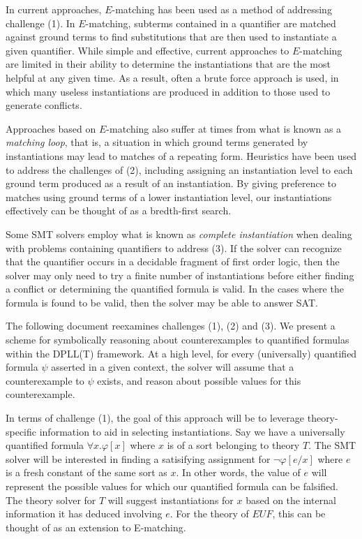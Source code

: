 \documentclass{llncs}
\begin{document}
In current approaches, $E$-matching has been used as a method of addressing challenge (1).
In $E$-matching, subterms contained in a quantifier are matched against ground terms to find substitutions that are then used to instantiate a given quantifier.
While simple and effective, current approaches to $E$-matching are limited in their ability to determine the instantiations that are the most helpful at any given time.
As a result, often a brute force approach is used, in which many useless instantiations are produced in addition to those used to generate conflicts.

Approaches based on $E$-matching also suffer at times from what is known as a \emph{matching loop}, that is, a situation in which ground terms generated by instantiations may lead to matches of a repeating form.
Heuristics have been used to address the challenges of (2), including assigning an instantiation level to each ground term produced as a result of an instantiation.
By giving preference to matches using ground terms of a lower instantiation level, our instantiations effectively can be thought of as a bredth-first search.

Some SMT solvers employ what is known as \emph{complete instantiation} when dealing with problems containing quantifiers to address (3).
If the solver can recognize that the quantifier occurs in a decidable fragment of first order logic, then the solver may only need to try a finite number of instantiations before either finding a conflict or determining the quantified formula is valid.
In the cases where the formula is found to be valid, then the solver may be able to answer SAT.

The following document reexamines challenges (1), (2) and (3).
We present a scheme for symbolically reasoning about counterexamples to quantified formulas within the DPLL(T) framework.
At a high level, for every (universally) quantified formula $\psi$ asserted in a given context, the solver will assume that a counterexample to $\psi$ exists, and reason about possible values for this counterexample.

In terms of challenge (1), the goal of this approach will be to leverage theory-specific information to aid in selecting instantiations.
Say we have a universally quantified formula $\forall x. \varphi[x]$ where $x$ is of a sort belonging to theory $T$.
The SMT solver will be interested in finding a satisifying assignment for $ \neg \varphi[e/x]$ where $e$ is a fresh constant of the same sort as $x$.
In other words, the value of $e$ will represent the possible values for which our quantified formula can be falsified.
The theory solver for $T$ will suggest instantiations for $x$ based on the internal information it has deduced involving $e$.
For the theory of $EUF$, this can be thought of as an extension to E-matching.
\end{document}
